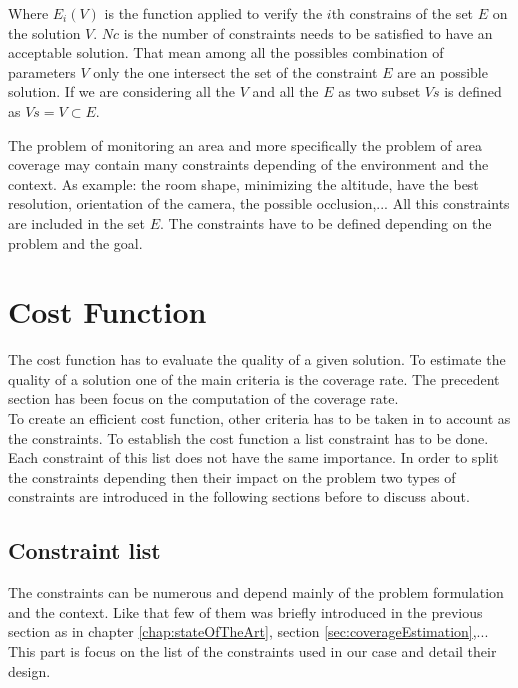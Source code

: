 Where $E_i(V)$ is the function applied to verify  the $i$th constrains of the set $E$ on the solution $V$. $Nc$ is the number of constraints needs to be satisfied to have an acceptable solution.
That mean among all the possibles combination of parameters $V$ only the one intersect the set of the constraint $E$ are an possible solution.  If we are considering  all the $V$ and all the $E$ as two subset $Vs$ is defined as $Vs=V\subset E$. 

The problem of monitoring an area and more specifically the problem of area coverage may contain many constraints depending of the environment and the context. As example: the room shape, minimizing  the altitude,  have the best resolution, orientation of the camera, the possible occlusion,... All this constraints are included in the set $E$. 
The constraints have to be defined depending on the problem and the goal.

\section{Cost Function}
The cost function has to evaluate the quality of a given solution. To estimate the quality of a solution one of the main criteria is the coverage rate. The precedent section has been focus on the computation of the coverage rate. \\
To create an efficient cost function, other criteria has to be taken in to account as the constraints.  
 To establish the cost function a list constraint has to be done. Each constraint of this list does not have the same importance. In order to split the constraints depending then their impact on the problem two types of constraints are introduced in the  following sections before to discuss about.
 

\subsection{Constraint list}\label{sec:constraint}

 The constraints can be numerous and depend mainly of the problem formulation and the context. Like that few of them was briefly introduced in the previous section as in chapter \ref{chap:stateOfTheArt}, section \ref{sec:coverageEstimation},... This part is focus on the list of the constraints used in our case and detail their design.

